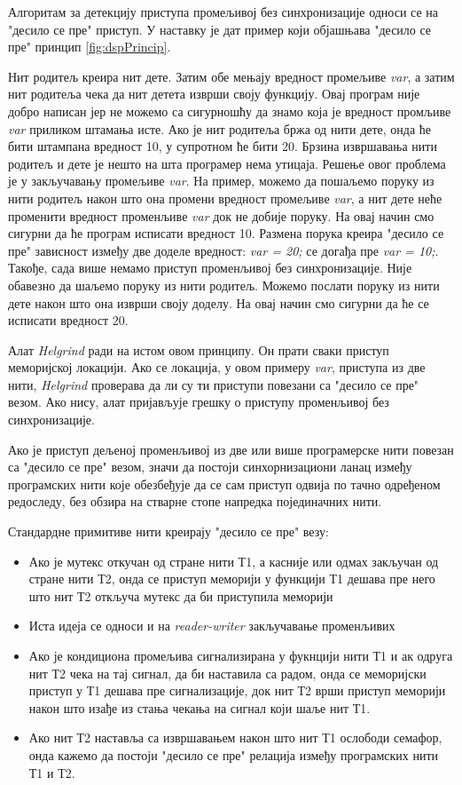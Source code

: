 \documentclass[12pt,oneside]{memoir}
\begin{document}
\indent Алгоритам за детекцију приступа промељивој без синхронизације односи се на "десило се пре" приступ. У наставку је дат пример који објашњава "десило се пре" принцип \ref{fig:dspPrincip}.

\indent Нит родитељ креира нит дете. Затим обе мењају вредност промељиве \textit{var}, а затим нит родитеља чека да нит детета изврши своју функцију. Овај програм није добро написан јер не можемо са сигурношћу да знамо која је вредност промљиве \textit{var} приликом штамања исте. Ако је нит родитеља бржа од нити дете, онда ће бити штампана вредност 10, у супротном ће бити 20. Брзина извршавања нити родитељ и дете је нешто на шта програмер нема утицаја. Решење овог проблема је у закључавању промељиве \textit{var}. На пример, можемо да пошаљемо поруку из нити родитељ након што она промени вредност промељиве \textit{var}, а нит дете неће променити вредност променљиве \textit{var} док не добије поруку. На овај начин смо сигурни  да ће програм исписати вредност 10. Размена порука креира "десило се пре" зависност између две доделе вредност: \textit{var = 20;} се догађа пре \textit{var = 10;}. Такође, сада више немамо приступ променљивој без синхронизације. Није обавезно да шаљемо поруку из нити родитељ. Можемо послати поруку из нити дете након што она изврши своју доделу. На овај начин смо сигурни да ће се исписати вредност 20.

\indent Алат \textit{Helgrind} ради на истом овом принципу. Он прати сваки приступ меморијској локацији. Ако се локација, у овом примеру \textit{var}, приступа из две нити, \textit{Helgrind} проверава да ли су ти приступи повезани са "десило се пре" везом. Ако нису, алат пријављује грешку о приступу променљивој без синхронизације.

\indent Ако је приступ дељеној променљивој из две или више програмерске нити повезан са "десило се пре" везом, значи да постоји синхорнизациони ланац између програмских нити које обезбеђује да се сам приступ одвија по тачно одређеном редоследу, без обзира на стварне стопе напредка појединачних нити.

\indent Стандардне примитиве нити креирају "десило се пре" везу:
\begin{itemize}
  \item Ако је мутекс откучан од стране нити Т1, а касније или одмах закључан од стране нити Т2, онда се приступ меморији у функцији Т1 дешава пре него што нит Т2 откључа мутекс да би приступила меморији
  \item Иста идеја се односи и на \textit{reader-writer} закључавање променљивих
  \item Ако је кондициона промељива сигнализирана у фукнцији нити Т1 и ак одруга нит Т2 чека на тај сигнал, да би наставила са радом, онда се меморијски приступ у Т1 дешава пре сигнализације, док нит Т2 врши приступ меморији након што изађе из стања чекања на сигнал који шаље нит Т1.
  \item Ако нит Т2 наставља са извршавањем након што нит Т1 ослободи семафор, онда кажемо да постоји "десило се пре" релација између програмских нити Т1 и Т2.
\end{itemize}
\end{document}
